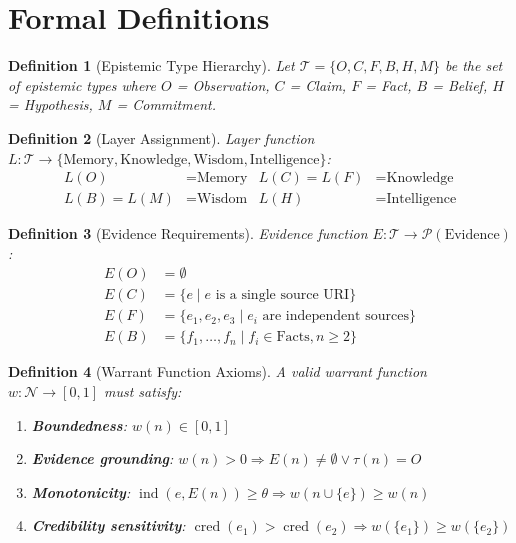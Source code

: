 \documentclass[11pt,letterpaper]{article}
\newtheorem{definition}{Definition}[section]
\begin{document}
\appendix
\section{Formal Definitions}
\label{app:formal}

\begin{definition}[Epistemic Type Hierarchy]
\label{def:types}
Let $\mathcal{T} = \{O, C, F, B, H, M\}$ be the set of epistemic types where $O$ = Observation, $C$ = Claim, $F$ = Fact, $B$ = Belief, $H$ = Hypothesis, $M$ = Commitment.
\end{definition}

\begin{definition}[Layer Assignment]
\label{def:layers}
Layer function $L: \mathcal{T} \to \{\text{Memory}, \text{Knowledge}, \text{Wisdom}, \text{Intelligence}\}$:
\begin{align*}
L(O) &= \text{Memory} & L(C) = L(F) &= \text{Knowledge} \\
L(B) = L(M) &= \text{Wisdom} & L(H) &= \text{Intelligence}
\end{align*}
\end{definition}

\begin{definition}[Evidence Requirements]
\label{def:evidence}
Evidence function $E: \mathcal{T} \to \mathcal{P}(\text{Evidence})$:
\begin{align*}
E(O) &= \emptyset \\
E(C) &= \{e \mid e \text{ is a single source URI}\} \\
E(F) &= \{e_1, e_2, e_3 \mid e_i \text{ are independent sources}\} \\
E(B) &= \{f_1, \ldots, f_n \mid f_i \in \text{Facts}, n \geq 2\}
\end{align*}
\end{definition}

\begin{definition}[Warrant Function Axioms]
\label{def:warrant}
A valid warrant function $w: \mathcal{N} \to [0,1]$ must satisfy:
\begin{enumerate}[noitemsep]
    \item[(W1)] \textbf{Boundedness}: $w(n) \in [0,1]$
    \item[(W2)] \textbf{Evidence grounding}: $w(n) > 0 \Rightarrow E(n) \neq \emptyset \vee \tau(n) = O$
    \item[(W3)] \textbf{Monotonicity}: $\operatorname{ind}(e, E(n)) \geq \theta \Rightarrow w(n \cup \{e\}) \geq w(n)$
    \item[(W4)] \textbf{Credibility sensitivity}: $\operatorname{cred}(e_1) > \operatorname{cred}(e_2) \Rightarrow w(\{e_1\}) \geq w(\{e_2\})$
\end{enumerate}
\end{definition}
\end{document}
